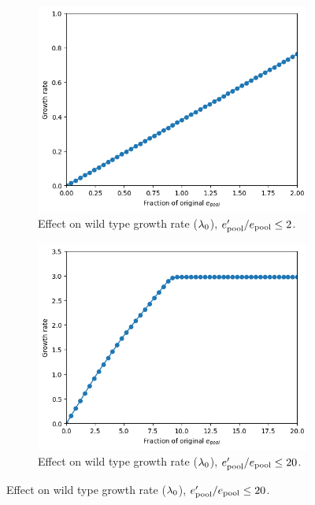 \begin{figure}
  \begin{subfigure}[htpb]{0.45\textwidth}
   \centering
   \includegraphics[width=\textwidth]{epool_ec_gr}
   \caption{
     Effect on wild type growth rate ($\lambda_{0}$), $e_{\mathrm{pool}}^{\prime}/e_{\mathrm{pool}} \leq 2$.
   }
   \label{fig:model-pool-growthrate}
  \end{subfigure}%
  \begin{subfigure}[htpb]{0.45\textwidth}
   \centering
   \includegraphics[width=\textwidth]{epool_ec_gr_20}
   \caption{
     Effect on wild type growth rate ($\lambda_{0}$), $e_{\mathrm{pool}}^{\prime}/e_{\mathrm{pool}} \leq 20$.
   }
   \label{fig:model-pool-growthrate-20}
  \end{subfigure}


\end{figure}
